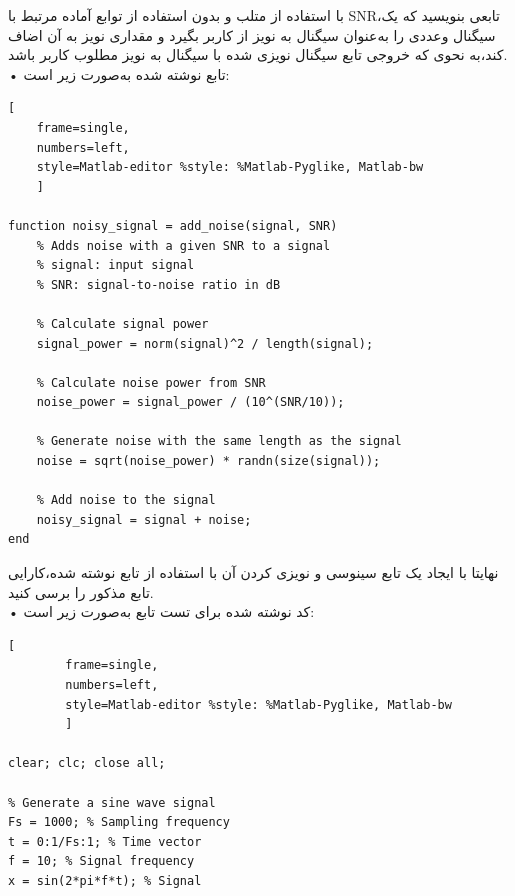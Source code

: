 \documentclass[12pt]{exam}
\newcommand{\class}{آزمایشگاه DSP}
\begin{document}

\pagestyle{empty}


\pagestyle{head}
\firstpageheader{}{}{}
\runningheader{صفحه \thepage\ از \numpages}{}{\class}
\runningheadrule

\vspace{0pt}




\begin{questions}

\question
با استفاده از متلب و بدون استفاده از توابع آماده مرتبط با SNR،‌تابعی بنویسید که یک سیگنال وعددی را به‌عنوان سیگنال به نویز از کاربر بگیرد و مقداری نویز به آن اضاف کند،‌به نحوی که خروجی تابع سیگنال نویزی شده با سیگنال به نویز مطلوب کاربر باشد.\\

• تابع نوشته شده به‌صورت زیر است: 
\begin{latin}
\begin{lstlisting}[
	frame=single,
	numbers=left,
	style=Matlab-editor %style: %Matlab-Pyglike, Matlab-bw
	] 
	
function noisy_signal = add_noise(signal, SNR)
	% Adds noise with a given SNR to a signal
	% signal: input signal
	% SNR: signal-to-noise ratio in dB
	
	% Calculate signal power
	signal_power = norm(signal)^2 / length(signal);
	
	% Calculate noise power from SNR
	noise_power = signal_power / (10^(SNR/10));
	
	% Generate noise with the same length as the signal
	noise = sqrt(noise_power) * randn(size(signal));
	
	% Add noise to the signal
	noisy_signal = signal + noise;
end

\end{lstlisting}
\end{latin}

\question
نهایتا با ایجاد یک تابع سینوسی و نویزی کردن آن با استفاده از تابع نوشته شده،‌کارایی تابع مذکور را برسی کنید. \\

• کد نوشته شده برای تست تابع به‌صورت زیر است: 
\begin{latin}
	\begin{lstlisting}[
		frame=single,
		numbers=left,
		style=Matlab-editor %style: %Matlab-Pyglike, Matlab-bw
		] 
		
clear; clc; close all;

% Generate a sine wave signal
Fs = 1000; % Sampling frequency
t = 0:1/Fs:1; % Time vector
f = 10; % Signal frequency
x = sin(2*pi*f*t); % Signal


\end{lstlisting}
\end{latin}
\end{questions}
\end{document}
